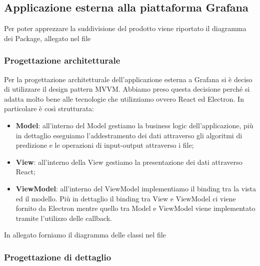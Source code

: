 	\subsection{Applicazione esterna alla piattaforma Grafana}
	Per poter apprezzare la suddivisione del prodotto viene riportato il diagramma dei Package, allegato nel file %
		\subsubsection{Progettazione architetturale}
			Per la progettazione architetturale dell'applicazione esterna a Grafana si è deciso di utilizzare il design pattern MVVM. Abbiamo preso questa decisione perché si adatta molto bene alle tecnologie che utilizziamo ovvero React ed Electron. In particolare è così strutturata:
		\begin{itemize}
			\item \textbf{Model}: all'interno del Model gestiamo la business logic dell'applicazione, più in dettaglio eseguiamo l'addestramento dei dati attraverso gli algoritmi di predizione e le operazioni di input-output attraverso i file;
			\item \textbf{View}: all'interno della View gestiamo la presentazione dei dati attraverso React;
			\item \textbf{ViewModel}: all'interno del ViewModel implementiamo il binding tra la vista ed il modello. Più in dettaglio il binding tra View e ViewModel ci viene fornito da Electron mentre quello tra Model e ViewModel viene implementato tramite l'utilizzo delle callback.
		\end{itemize}
		In allegato forniamo il diagramma delle classi nel file %
		\subsubsection{Progettazione di dettaglio}
